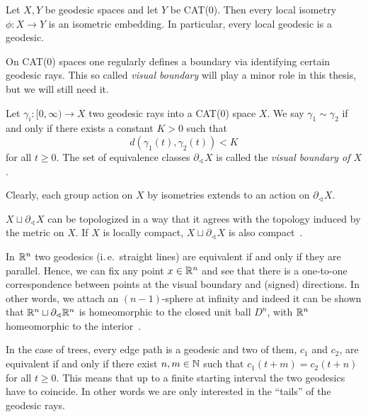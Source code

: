 \begin{prop}
  Let \(X,Y\) be geodesic spaces and let \(Y\) be CAT(0). Then every local isometry \(\phi \colon X \to Y\) is an isometric embedding. In particular, every local geodesic is a geodesic.
\end{prop}

On CAT(0) spaces one regularly defines a boundary via identifying certain geodesic rays. This so called \emph{visual boundary} will play a minor role in this thesis, but we will still need it. 

\begin{defin}
  \label{defin:visual}
  Let \(\gamma_i \colon [0, \infty) \to X\) two geodesic rays into a CAT(0) space \(X\). We say \(\gamma_1 \sim \gamma_2\) if and only if there exists a constant \(K > 0 \) such that
  \[
    d(\gamma_1(t), \gamma_2(t)) < K
  \]
  for all \(t \geq 0\). The set of equivalence classes \(\partial_\sphericalangle X\) is called the \emph{visual boundary of \(X\)}.

  Clearly, each group action on \(X\) by isometries extends to an action on \(\partial_\sphericalangle X\).
\end{defin}

\begin{rem}
  \(X \sqcup \partial_{\sphericalangle}X\) can be topologized in a way that it agrees with the topology induced by the metric on \(X\). If \(X\) is locally compact, \(X \sqcup \partial_\sphericalangle X\) is also compact\ \cite[c.\,f.][Sec.~II.8]{MR1744486}.
\end{rem}

\begin{bsp}
  In \(\mathbb{R}^n\) two geodesics (i.\,e.\ straight lines) are equivalent if and only if they are parallel. Hence, we can fix any point \(x \in \mathbb{R}^n\) and see that there is a one-to-one correspondence between points at the visual boundary and (signed) directions. In other words, we attach an \((n-1)\)-sphere at infinity and indeed it can be shown that \(\mathbb{R}^n \sqcup \partial_\sphericalangle \mathbb{R}^n\) is homeomorphic to the closed unit ball \(D^n\), with \(\mathbb{R}^n\) homeomorphic to the interior\ \cite[c.\,f.][Section~II.8]{MR1744486}.
\end{bsp}
\begin{bsp}[Trees]
  In the case of trees, every edge path is a geodesic and two of them, \(c_1\) and \(c_2\), are equivalent if and only if there exist \(n,m \in \mathbb{N}\) such that \(c_1(t+m) = c_2(t+n)\) for all \(t\geq0\). This means that up to a finite starting interval the two geodesics have to coincide. In other words we are only interested in the \enquote{tails} of the geodesic rays.
\end{bsp}

